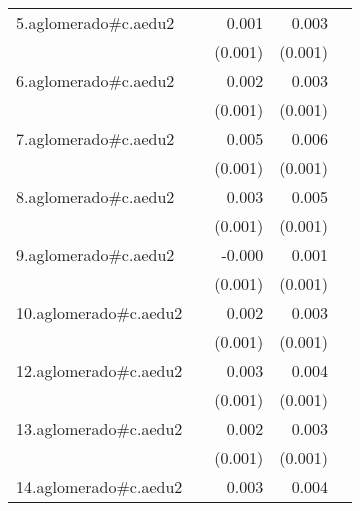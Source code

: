 {\begin{longtable}{l*{4}{D{.}{.}{-1}}}
\addlinespace
5.aglomerado#c.aedu2&                     &       0.001         &       0.003\sym{***}&                     \\
            &                     &     (0.001)         &     (0.001)         &                     \\
\addlinespace
6.aglomerado#c.aedu2&                     &       0.002         &       0.003\sym{**} &                     \\
            &                     &     (0.001)         &     (0.001)         &                     \\
\addlinespace
7.aglomerado#c.aedu2&                     &       0.005\sym{***}&       0.006\sym{***}&                     \\
            &                     &     (0.001)         &     (0.001)         &                     \\
\addlinespace
8.aglomerado#c.aedu2&                     &       0.003\sym{**} &       0.005\sym{***}&                     \\
            &                     &     (0.001)         &     (0.001)         &                     \\
\addlinespace
9.aglomerado#c.aedu2&                     &      -0.000         &       0.001         &                     \\
            &                     &     (0.001)         &     (0.001)         &                     \\
\addlinespace
10.aglomerado#c.aedu2&                     &       0.002         &       0.003\sym{***}&                     \\
            &                     &     (0.001)         &     (0.001)         &                     \\
\addlinespace
12.aglomerado#c.aedu2&                     &       0.003\sym{*}  &       0.004\sym{***}&                     \\
            &                     &     (0.001)         &     (0.001)         &                     \\
\addlinespace
13.aglomerado#c.aedu2&                     &       0.002         &       0.003\sym{***}&                     \\
            &                     &     (0.001)         &     (0.001)         &                     \\
\addlinespace
14.aglomerado#c.aedu2&                     &       0.003\sym{*}  &       0.004\sym{***}&                     \\

\end{longtable}}
